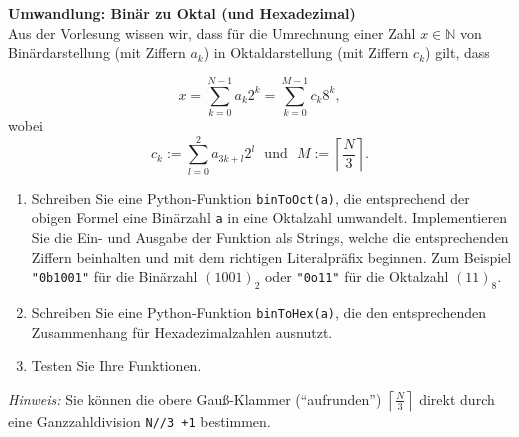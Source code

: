 \textbf{Umwandlung: Binär zu Oktal (und Hexadezimal)}\\
Aus der Vorlesung wissen wir, dass für die Umrechnung einer Zahl $x \in \mathbb{N}$ von Binärdarstellung
(mit Ziffern $a_k$) in Oktaldarstellung (mit Ziffern $c_k$) gilt, dass

$$
x = \sum_{k=0}^{N-1} a_k 2^k = \sum_{k=0}^{M-1} c_k 8^k,
$$
wobei
$$
c_k := \sum_{l=0}^{2} a_{3k+l}2^l ~~~\text{und}~~~M := \left\lceil{\frac{N}{3}} \right\rceil.
$$



\begin{enumerate}
	\item Schreiben Sie eine Python-Funktion \verb|binToOct(a)|, die entsprechend der obigen Formel
	eine Binärzahl \texttt{a} in eine Oktalzahl umwandelt. Implementieren Sie die Ein- und Ausgabe der Funktion als Strings, welche die entsprechenden Ziffern beinhalten und mit dem richtigen Literalpräfix beginnen. Zum Beispiel \texttt{"0b1001"} für die Binärzahl $(1001)_2$ oder \texttt{"0o11"} für die Oktalzahl $(11)_8$.
	\item Schreiben Sie eine Python-Funktion \verb|binToHex(a)|, die den entsprechenden Zusammenhang für Hexadezimalzahlen ausnutzt.
	\item Testen Sie Ihre Funktionen.
\end{enumerate}
\textit{Hinweis:} Sie können die obere Gauß-Klammer (``aufrunden'') $\left\lceil{\frac{N}{3}} \right\rceil$ direkt durch eine Ganzzahldivision \verb|N//3 +1| bestimmen.